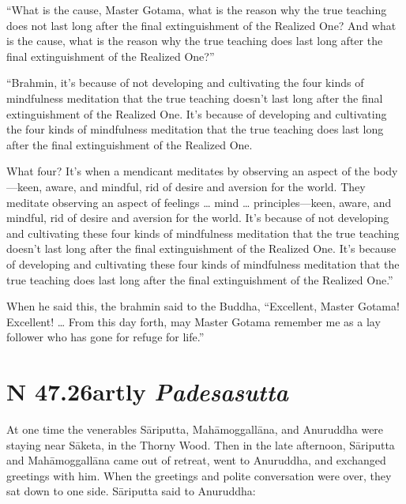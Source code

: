 \documentclass[12pt,openany]{book}%
\newcommand*{\suttatitleacronym}[1]{\smaller[2]{#1}\vspace*{.3em}}
\newcommand*{\suttatitletranslation}[1]{\linebreak{#1}}
\newcommand*{\suttatitleroot}[1]{\linebreak\smaller[2]\itshape{#1}}
\newcommand*{\tocacronym}[1]{\hspace*{-3.3em}{#1}\quad}
\newcommand*{\toctranslation}[1]{#1}
\newcommand*{\tocroot}[1]{(\textit{#1})}
\begin{document}
“What is the cause, Master Gotama, what is the reason why the true teaching does not last long after the final extinguishment of the Realized One? And what is the cause, what is the reason why the true teaching does last long after the final extinguishment of the Realized One?” 

“Brahmin, it’s because of not developing and cultivating the four kinds of mindfulness meditation that the true teaching doesn’t last long after the final extinguishment of the Realized One. It’s because of developing and cultivating the four kinds of mindfulness meditation that the true teaching does last long after the final extinguishment of the Realized One. 

What four? It’s when a mendicant meditates by observing an aspect of the body—keen, aware, and mindful, rid of desire and aversion for the world. They meditate observing an aspect of feelings … mind … principles—keen, aware, and mindful, rid of desire and aversion for the world. It’s because of not developing and cultivating these four kinds of mindfulness meditation that the true teaching doesn’t last long after the final extinguishment of the Realized One. It’s because of developing and cultivating these four kinds of mindfulness meditation that the true teaching does last long after the final extinguishment of the Realized One.” 

When he said this, the brahmin said to the Buddha, “Excellent, Master Gotama! Excellent! … From this day forth, may Master Gotama remember me as a lay follower who has gone for refuge for life.” 

%
\section*{{\suttatitleacronym SN 47.26}{\suttatitletranslation Partly }{\suttatitleroot Padesasutta}}
\addcontentsline{toc}{section}{\tocacronym{SN 47.26} \toctranslation{Partly } \tocroot{Padesasutta}}

At one time the venerables \textsanskrit{Sāriputta}, \textsanskrit{Mahāmoggallāna}, and Anuruddha were staying near \textsanskrit{Sāketa}, in the Thorny Wood. Then in the late afternoon, \textsanskrit{Sāriputta} and \textsanskrit{Mahāmoggallāna} came out of retreat, went to Anuruddha, and exchanged greetings with him. When the greetings and polite conversation were over, they sat down to one side. \textsanskrit{Sāriputta} said to Anuruddha: 
\end{document}
